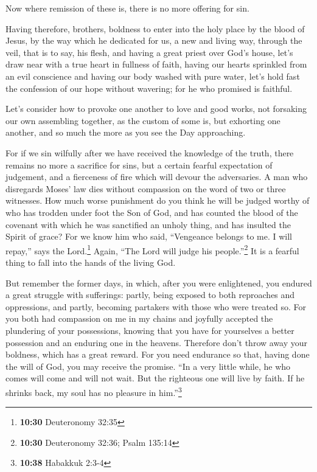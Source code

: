  Now where remission of these is, there is no more
offering for sin.

 Having therefore, brothers, boldness to enter into the
holy place by the blood of Jesus,  by the way which he
dedicated for us, a new and living way, through the veil, that is to
say, his flesh,  and having a great priest over God's
house,  let's draw near with a true heart in fullness of
faith, having our hearts sprinkled from an evil conscience and having
our body washed with pure water,  let's hold fast the
confession of our hope without wavering; for he who promised is
faithful.

 Let's consider how to provoke one another to love and
good works,  not forsaking our own assembling together,
as the custom of some is, but exhorting one another, and so much the
more as you see the Day approaching.

 For if we sin wilfully after we have received the
knowledge of the truth, there remains no more a sacrifice for sins,
 but a certain fearful expectation of judgement, and a
fierceness of fire which will devour the adversaries.  A
man who disregards Moses' law dies without compassion on the word of two
or three witnesses.  How much worse punishment do you
think he will be judged worthy of who has trodden under foot the Son of
God, and has counted the blood of the covenant with which he was
sanctified an unholy thing, and has insulted the Spirit of grace?
 For we know him who said, ``Vengeance belongs to me. I
will repay,'' says the Lord.\footnote{\textbf{10:30} Deuteronomy 32:35}
Again, ``The Lord will judge his people.''\footnote{\textbf{10:30}
  Deuteronomy 32:36; Psalm 135:14}  It is a fearful thing
to fall into the hands of the living God.

 But remember the former days, in which, after you were
enlightened, you endured a great struggle with sufferings:
 partly, being exposed to both reproaches and
oppressions, and partly, becoming partakers with those who were treated
so.  For you both had compassion on me in my chains and
joyfully accepted the plundering of your possessions, knowing that you
have for yourselves a better possession and an enduring one in the
heavens.  Therefore don't throw away your boldness, which
has a great reward.  For you need endurance so that,
having done the will of God, you may receive the promise.
 ``In a very little while, he who comes will come and
will not wait.  But the righteous one will live by faith.
If he shrinks back, my soul has no pleasure in him.''\footnote{\textbf{10:38}
  Habakkuk 2:3-4}

